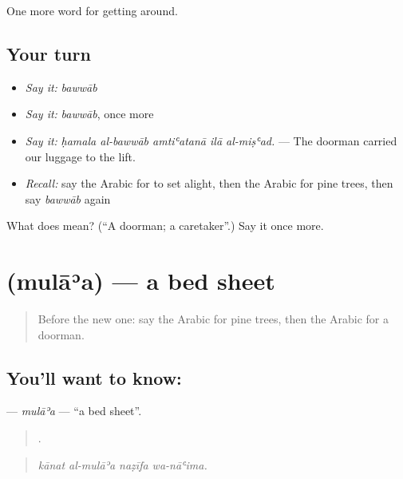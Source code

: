\begin{grammarlens}[title={What you've built}]
One more word for getting around.
\end{grammarlens}

\subsection*{Your turn}
\begin{itemize}
\raggedright
  \item \emph{Say it:} \emph{bawwāb}
  \item \emph{Say it:} \emph{bawwāb}, once more
  \item \emph{Say it:} \emph{ḥamala al-bawwāb amtiʿatanā ilā al-miṣʿad.} — The doorman carried our luggage to the lift.
  \item \emph{Recall:} say the Arabic for to set alight, then the Arabic for pine trees, then say \emph{bawwāb} again
\end{itemize}

\begin{tcolorbox}[breakable,colback=teal!4,colframe=teal!35!black,title={Before you move on}]
What does  mean? (\textquotedblleft{}A doorman; a caretaker\textquotedblright{}.) Say it once more.
\end{tcolorbox}
\section[\texorpdfstring{\ar{ملاءة} (mulāʾa)}{ملاءة (mulāʾa)}]{ (mulāʾa) — a bed sheet}

\label{lesson:AR-C443-mulaa}



\begin{quote}
Before the new one: say the Arabic for pine trees, then the Arabic for a doorman.
\end{quote}

\subsection*{You'll want to know: }
\textbf{} — \emph{mulāʾa} — \textquotedblleft{}a bed sheet\textquotedblright{}.

\begin{quote}
   .
\end{quote}

\begin{quote}
\emph{kānat al-mulāʾa naẓīfa wa-nāʿima.}
\end{quote}

